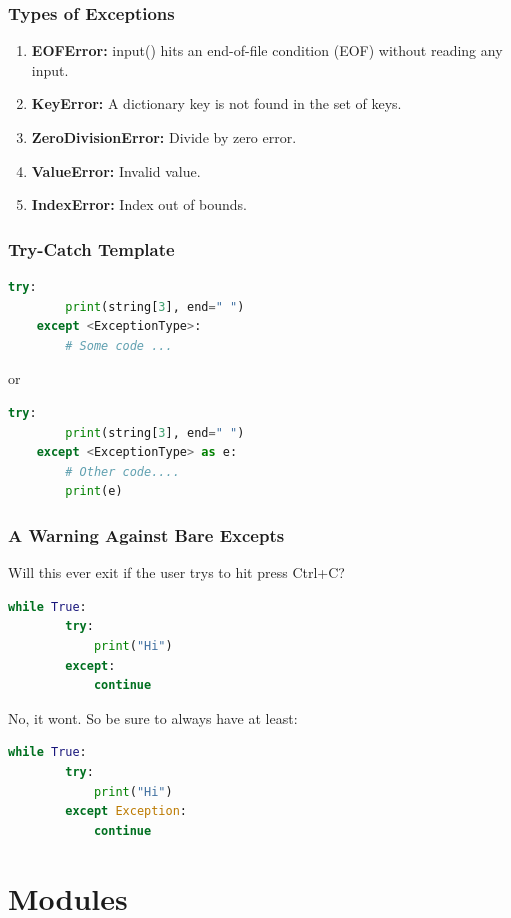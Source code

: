 \documentclass{beamer}
\begin{document}
%
%
\begin{frame}[fragile]
    \frametitle{Types of Exceptions}
    \vfill
    \begin{enumerate}[A]
        \item \textbf{EOFError: } input() hits an end-of-file condition (EOF) without reading any input.
        \item \textbf{KeyError: } A dictionary key is not found in the set of keys.
        \item \textbf{ZeroDivisionError: } Divide by zero error.
        \item \textbf{ValueError: } Invalid value.
        \item \textbf{IndexError: } Index out of bounds.
    \end{enumerate}
    \vfill
\end{frame}

%
%
\begin{frame}[fragile]
    \frametitle{Try-Catch Template}
    \vfill
    \begin{lstlisting}[language=Python, autogobble]
    try:
        print(string[3], end=" ")
    except <ExceptionType>:
        # Some code ...
    \end{lstlisting}
    \vfill
    or
    \vfill
    \begin{lstlisting}[language=Python, autogobble]
    try:
        print(string[3], end=" ")
    except <ExceptionType> as e:
        # Other code....
        print(e)
    \end{lstlisting}
    \vfill
\end{frame}

%
%
\begin{frame}[fragile]
    \frametitle{A Warning Against Bare Excepts}
    Will this ever exit if the user trys to hit press Ctrl+C?
    \begin{lstlisting}[language=Python, autogobble]
    while True:
        try:
            print("Hi")
        except:
            continue
    \end{lstlisting}
    \pause
    \vfill
    No, it wont. So be sure to always have at least:
    \vfill
    \begin{lstlisting}[language=Python, autogobble]
    while True:
        try:
            print("Hi")
        except Exception:
            continue
    \end{lstlisting}
    \vfill
\end{frame}

\section{Modules}
\end{document}
